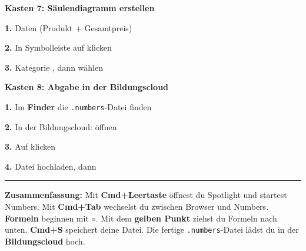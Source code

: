 \documentclass[11pt, a4paper]{article}
\newcommand{\luecke}[1]{\underline{\hspace{#1}}}
\begin{document}
\begin{multicols}{2}

\textbf{\textcolor{fachfarbe}{Kasten 7: Säulendiagramm erstellen}}

\begin{lueckenkasten}
\textbf{1.} Daten (Produkt + Gesamtpreis) \luecke{2.5cm}

\textbf{2.} In Symbolleiste auf \luecke{2.5cm} klicken

\textbf{3.} Kategorie \luecke{2cm}, dann \luecke{2.5cm} wählen
\end{lueckenkasten}


\textbf{\textcolor{fachfarbe}{Kasten 8: Abgabe in der Bildungscloud}}

\begin{lueckenkasten}
\textbf{1.} Im \textbf{Finder} die \texttt{.numbers}-Datei finden

\textbf{2.} In der Bildungscloud: \luecke{2.5cm} öffnen

\textbf{3.} Auf \luecke{3cm} klicken

\textbf{4.} Datei hochladen, dann \luecke{2.5cm}
\end{lueckenkasten}

\end{multicols}

\vspace{0.3em}
\hrule
\vspace{0.4em}


\begin{merkkasten}
\textbf{Zusammenfassung:} Mit \textbf{Cmd+Leertaste} öffnest du Spotlight und startest Numbers. Mit \textbf{Cmd+Tab} wechselst du zwischen Browser und Numbers. \textbf{Formeln} beginnen mit \texttt{=}. Mit dem \textbf{gelben Punkt} ziehst du Formeln nach unten. \textbf{Cmd+S} speichert deine Datei. Die fertige \texttt{.numbers}-Datei lädst du in der \textbf{Bildungscloud} hoch.
\end{merkkasten}
\end{document}
